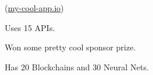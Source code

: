 \documentclass[10pt]{akshay-resume}
\begin{document}
\begin{minipage}[t]{0.6\textwidth}
\vspace{-1.4em}

{({\href{my-cool-app.io}{my-cool-app.io}})}
{\vspace{-1em}}
{\begin{tightemize}
\item Uses 15 APIs.
\item Won some pretty cool sponsor prize.
\item Has 20 Blockchains and 30 Neural Nets.
\end{tightemize}}

\end{minipage} 
\end{document}
